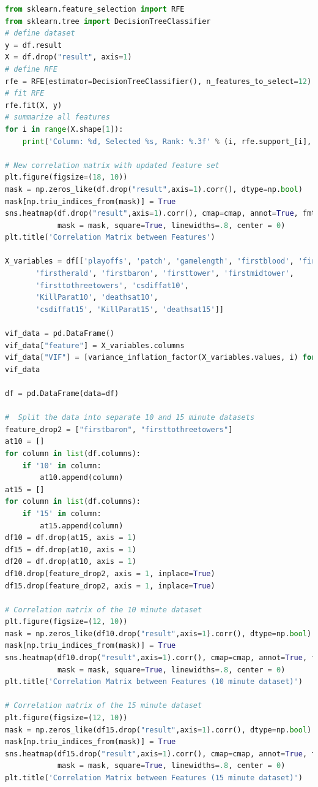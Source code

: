 \begin{lstlisting}[language=python,label={lst:pythoncode}]
from sklearn.feature_selection import RFE
from sklearn.tree import DecisionTreeClassifier
# define dataset
y = df.result
X = df.drop("result", axis=1)
# define RFE
rfe = RFE(estimator=DecisionTreeClassifier(), n_features_to_select=12)
# fit RFE
rfe.fit(X, y)
# summarize all features
for i in range(X.shape[1]):
    print('Column: %d, Selected %s, Rank: %.3f' % (i, rfe.support_[i], rfe.ranking_[i]))

# New correlation matrix with updated feature set
plt.figure(figsize=(18, 10))
mask = np.zeros_like(df.drop("result",axis=1).corr(), dtype=np.bool)
mask[np.triu_indices_from(mask)] = True
sns.heatmap(df.drop("result",axis=1).corr(), cmap=cmap, annot=True, fmt='.2f', vmin=-1, vmax=1,
            mask = mask, square=True, linewidths=.8, center = 0)
plt.title('Correlation Matrix between Features')

X_variables = df[['playoffs', 'patch', 'gamelength', 'firstblood', 'firstdragon',
       'firstherald', 'firstbaron', 'firsttower', 'firstmidtower',
       'firsttothreetowers', 'csdiffat10',
       'KillParat10', 'deathsat10',
       'csdiffat15', 'KillParat15', 'deathsat15']]

vif_data = pd.DataFrame()
vif_data["feature"] = X_variables.columns
vif_data["VIF"] = [variance_inflation_factor(X_variables.values, i) for i in range(len(X_variables.columns))]
vif_data

df = pd.DataFrame(data=df)

#  Split the data into separate 10 and 15 minute datasets
feature_drop2 = ["firstbaron", "firsttothreetowers"]
at10 = []
for column in list(df.columns):
    if '10' in column:
        at10.append(column)
at15 = []
for column in list(df.columns):
    if '15' in column:
        at15.append(column)
df10 = df.drop(at15, axis = 1)
df15 = df.drop(at10, axis = 1)
df20 = df.drop(at10, axis = 1)
df10.drop(feature_drop2, axis = 1, inplace=True)
df15.drop(feature_drop2, axis = 1, inplace=True)

# Correlation matrix of the 10 minute dataset
plt.figure(figsize=(12, 10))
mask = np.zeros_like(df10.drop("result",axis=1).corr(), dtype=np.bool)
mask[np.triu_indices_from(mask)] = True
sns.heatmap(df10.drop("result",axis=1).corr(), cmap=cmap, annot=True, fmt='.2f', vmin=-1, vmax=1,
            mask = mask, square=True, linewidths=.8, center = 0)
plt.title('Correlation Matrix between Features (10 minute dataset)')

# Correlation matrix of the 15 minute dataset
plt.figure(figsize=(12, 10))
mask = np.zeros_like(df15.drop("result",axis=1).corr(), dtype=np.bool)
mask[np.triu_indices_from(mask)] = True
sns.heatmap(df15.drop("result",axis=1).corr(), cmap=cmap, annot=True, fmt='.2f', vmin=-1, vmax=1,
            mask = mask, square=True, linewidths=.8, center = 0)
plt.title('Correlation Matrix between Features (15 minute dataset)')


\end{lstlisting}
